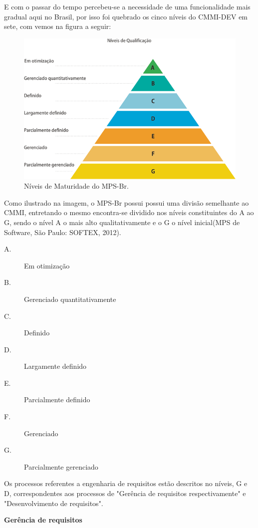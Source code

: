 E com o passar do tempo percebeu-se a necessidade de uma funcionalidade mais gradual aqui no Brasil, por isso foi quebrado os cinco níveis do CMMI-DEV em sete, com vemos na figura a seguir:
  \begin{figure}[!htbp]
    \centering
    \includegraphics[scale=0.5]{editaveis/figuras/650x432xniveis_de_qualificacao}
    \caption[Níveis de Maturidade do MPS-Br]{Níveis de Maturidade do MPS-Br. \footnotemark}
    \label{niveis-maturidade-mps-br}
  \end{figure}
  
Como ilustrado na imagem, o MPS-Br possui possui uma divisão semelhante ao CMMI, entretando o mesmo encontra-se dividido nos níveis constituintes do A ao G, sendo o nível A o mais alto qualitativamente e o G o nível inicial(MPS de Software, São Paulo: SOFTEX, 2012).	
\begin{description}
\item[A.] Em otimização
\item[B.] Gerenciado quantitativamente
\item[C.] Definido
\item[D.] Largamente definido
\item[E.] Parcialmente definido
\item[F.] Gerenciado
\item[G.] Parcialmente gerenciado	
\end{description}			

Os processos referentes a engenharia de requisitos estão descritos no níveis, G e D, correspondentes aos processos de "Gerência de requisitos respectivamente" e "Desenvolvimento de requisitos".

\textbf{Gerência de requisitos}

